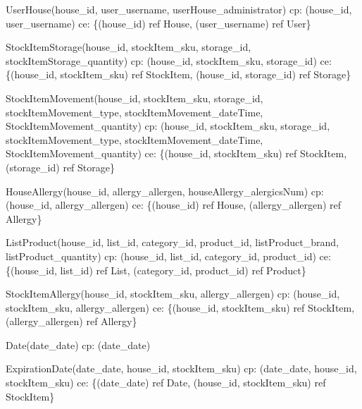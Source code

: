 {\begin{description}
		\item UserHouse(house\_id, user\_username, userHouse\_administrator) \newline
		\acrshort{cp}: (house\_id, user\_username) \newline
		\acrshort{ce}: \{(house\_id) ref House, (user\_username) ref User\}
		
		\item StockItemStorage(house\_id, stockItem\_sku, storage\_id, stockItemStorage\_quantity) \newline
		\acrshort{cp}: (house\_id, stockItem\_sku, storage\_id) \newline
		\acrshort{ce}: \{(house\_id, stockItem\_sku) ref StockItem, (house\_id, storage\_id) ref Storage\}
		
		\item StockItemMovement(house\_id, stockItem\_sku, storage\_id, stockItemMovement\_type, \newline stockItemMovement\_dateTime, StockItemMovement\_quantity) \newline
		\acrshort{cp}: (house\_id, stockItem\_sku, storage\_id, stockItemMovement\_type, stockItemMovement\_dateTime, StockItemMovement\_quantity) \newline
		\acrshort{ce}: \{(house\_id, stockItem\_sku) ref StockItem, (storage\_id) ref Storage\}
		
		\item HouseAllergy(house\_id, allergy\_allergen, houseAllergy\_alergicsNum) \newline
		\acrshort{cp}: (house\_id, allergy\_allergen) \newline
		\acrshort{ce}: \{(house\_id) ref House, (allergy\_allergen) ref Allergy\}
	
		\item ListProduct(house\_id, list\_id, category\_id, product\_id, listProduct\_brand, listProduct\_quantity) \newline
		\acrshort{cp}: (house\_id, list\_id, category\_id, product\_id) \newline
		\acrshort{ce}: \{(house\_id, list\_id) ref List, (category\_id, product\_id) ref Product\}
	
		\item StockItemAllergy(house\_id, stockItem\_sku, allergy\_allergen) \newline
		\acrshort{cp}: (house\_id, stockItem\_sku, allergy\_allergen) \newline
		\acrshort{ce}: \{(house\_id, stockItem\_sku) ref StockItem, (allergy\_allergen) ref Allergy\}
	
		\item Date(date\_date) \newline
		\acrshort{cp}: (date\_date)
	
		\item ExpirationDate(date\_date, house\_id, stockItem\_sku) \newline
		\acrshort{cp}: (date\_date, house\_id, stockItem\_sku) \newline
		\acrshort{ce}: \{(date\_date) ref Date, (house\_id, stockItem\_sku) ref StockItem\}

	\end{description}	
}

